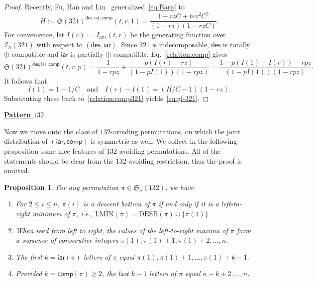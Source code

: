 \documentclass[12pt]{amsart}
\numberwithin{equation}{section}
\theoremstyle{plain}
\newtheorem{proposition}[theorem]{Proposition}
\theoremstyle{definition}
\def\des{\mathsf{des}}
\def\S{\mathfrak{S}}
\def\iar{\mathsf{iar}}
\def\comp{\mathsf{comp}}
\def\LMIN{\mathrm{LMIN}}
\def\DESB{\mathrm{DESB}}
\newcommand{\In}{\mathcal{I}}
\def\DESB{\mathrm{DESB}}
\begin{document}
\begin{proof}
Recently, Fu, Han and Lin~\cite[Lemma 4.5]{FHL} generalized~\eqref{eq:Barn} to 
\begin{equation*}
H:=\S(321)^{\des,\iar,\comp}(t,r,1)=\frac{1-rzC+trz^2C^2}{(1-rz)(1-rzC)}.
\end{equation*}
For convenience, let $I(r):=I_{321}(t,r)$ be the generating function over $\In_n(321)$ with respect to $(\des,\iar)$. Since $321$ is indecomposable, $\des$ is totally $\oplus$-compatible and $\iar$ is partially  $\oplus$-compatible, Eq.~\eqref{relation:comp} gives 
\begin{equation}\label{relation:comp321}
\S(321)^{\des,\iar,\comp}(t,r,p)=\frac{1}{1-rpz}+\frac{p(I(r)-rz)}{(1-pI(1))(1-rpz)}=\frac{1-p(I(1)-I(r))-rpz}{(1-pI(1))(1-rpz)}.
\end{equation}
It follows that 
$$
I(1)=1-1/C\quad\text{and}\quad I(r)-I(1)=(H/C-1)(1-rz).
$$
Substituting these back to~\eqref{relation:comp321} yields~\eqref{eq:gf-321}. 



\end{proof}



\noindent \underline{\bf Pattern $132$}
\medskip

Now we move onto the class of $132$-avoiding permutations, on which the joint distribution of $(\iar,\comp)$ is symmetric as well. We collect in the following proposition some nice features of $132$-avoiding permutations. All of the statements should be clear from the $132$-avoiding restriction, thus the proof is omitted.
\begin{proposition}\label{prop:desbot=lmin}
For any permutation $\pi\in\S_n(132)$, we have
\begin{enumerate}
\item For $2\le i\le n$, $\pi(i)$ is a descent bottom of $\pi$ if and only if it is a left-to-right minimum of $\pi$, i.e., $\LMIN(\pi)=\DESB(\pi)\cup\{\pi(1)\}$.
\item When read from left to right, the values of the left-to-right maxima of $\pi$ form a sequence of consecutive integers $\pi(1),\pi(1)+1,\pi(1)+2,\ldots,n$. 
\item The first $k = \iar(\pi)$ letters of $\pi$ equal $\pi(1),\pi(1)+1,\ldots,\pi(1)+k-1.$
\item Provided $k = \comp(\pi) \ge 2$, the last $k-1$ letters of $\pi$ equal $n-k+2,\ldots,n$.
\end{enumerate}
\end{proposition}
\end{document}
